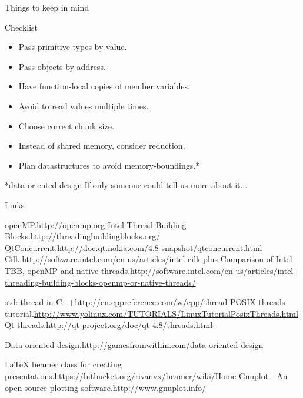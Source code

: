 \documentclass{beamer}
\begin{document}
\begin{frame}{Things to keep in mind}

\begin{block}{Checklist}
  \small
  \begin{itemize}
    \item Pass primitive types by value.
    \item Pass objects by address.
    \item Have function-local copies of member variables.
    \item Avoid to read values multiple times.
    \item Choose correct chunk size.
    \item Instead of shared memory, consider reduction.
    \item Plan datastructures to avoid memory-boundings.* 
  \end{itemize}
\end{block}

\pause

\begin{exampleblock}{*data-oriented design\cite{data_oriented_design}}
\small
If only someone could tell us more about it...
\end{exampleblock}

\end{frame}


\begin{frame}{Links}

\tiny
\begin{thebibliography}{100}
openMP.\url{http://openmp.org}
Intel Thread Building Blocks.\url{http://threadingbuildingblocks.org/}
QtConcurrent.\url{http://doc.qt.nokia.com/4.8-snapshot/qtconcurrent.html}
Cilk.\url{http://software.intel.com/en-us/articles/intel-cilk-plus}
Comparison of Intel TBB, openMP and native threads.\url{http://software.intel.com/en-us/articles/intel-threading-building-blocks-openmp-or-native-threads/}

std::thread in C++\url{http://en.cppreference.com/w/cpp/thread}
POSIX threads tutorial.\url{http://www.yolinux.com/TUTORIALS/LinuxTutorialPosixThreads.html}
Qt threads.\url{http://qt-project.org/doc/qt-4.8/threads.html}

Data oriented design.\url{http://gamesfromwithin.com/data-oriented-design}

\LaTeX{} beamer class for creating presentations.\url{https://bitbucket.org/rivanvx/beamer/wiki/Home}
Gnuplot - An open source plotting software.\url{http://www.gnuplot.info/}

\end{thebibliography}
\end{frame}
\end{document}
